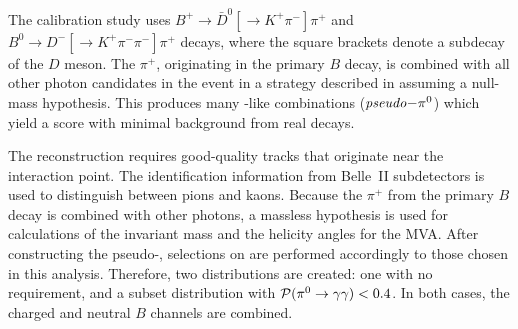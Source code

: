The calibration study uses $B^+\to \bar{D}^0[\to K^+\pi^-]\pi^+$ and $B^0\to D^-[\to K^+\pi^-\pi^-]\pi^+$ decays, where the square brackets denote a subdecay of the $D$ meson.
The $\pi^+$, originating in the primary $B$ decay, is combined with all other photon candidates in the event in a strategy described in  assuming a null-mass hypothesis.
This produces many \piz-like combinations ($\mathit{pseudo}\mathrm{-}\pi^0$) which yield a \piVeto score with minimal background from real \piz decays.

The reconstruction requires good-quality tracks that originate near the interaction point.
The identification information from Belle~II subdetectors is used to distinguish between pions and kaons.
Because the $\pi^+$ from the primary $B$ decay is combined with other photons, a massless hypothesis is used for calculations of the invariant mass and the helicity angles for the MVA.
After constructing the pseudo-\piz, selections on \piVeto are performed accordingly to those chosen in this analysis.
Therefore, two distributions are created: one with no \piVeto requirement, and a subset distribution with ${\mathcal{P}(\pi^0\rightarrow\gamma\gamma)}<0.4$.
In both cases, the charged and neutral $B$ channels are combined.

